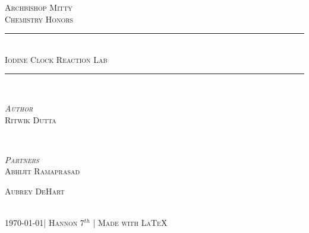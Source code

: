 \documentclass[11pt]{article}
\begin{document}
\begin{titlepage}

\newcommand{\HRule}{\rule{\linewidth}{0.5mm}} %
\newcommand{\tab}[1]{\hspace{.05\textwidth}\rlap{#1}}
\center %
 
\textsc{\Large Archbishop Mitty}\\[0.5cm] %
\textsc{\large Chemistry Honors}\\[0.5cm] %


\HRule \\[0.4cm]
\textsc{ \huge Iodine Clock Reaction Lab}\\ %
\HRule \\[1cm]
 

\begin{minipage}{0.4\textwidth}
\begin{flushleft} \large
{\textsc{\emph{Author}}}\\
\textsc{Ritwik Dutta}
\end{flushleft}
\end{minipage}
~
\begin{minipage}{0.4\textwidth}
\begin{flushright} \large
\small{\textsc{\emph{Partners}}}\\
\small{\textsc{Abhijit Ramaprasad}}

\small{\textsc{Aubrey DeHart}} %
\end{flushright}
\end{minipage}\\[4cm]

\vfill %
\large{\textsc{ \today \space | Hannon 7$^{th}$ | Made with \LaTeX}\\[3cm]}

\end{titlepage}
\end{document}

